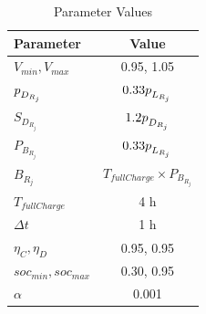 \documentclass[../../outputs/main.tex]{subfiles}
\begin{document}
\def\ds{\rule{0pt}{1.5ex}} %

\begin{table}[h!]
    \centering
    \caption{Parameter Values}
    \begin{tabular}{|l|c|}
    \hline
    \textbf{Parameter} & \textbf{Value} \\ \hline
    $V_{min}, V_{max}$ & 0.95, 1.05 \\ \hline
    $p_{\ds D_{R_j}}$ & $0.33 p_{\ds L_{R_j}}$ \\ \hline
    $S_{D_{R_j}}$ & $1.2 p_{\ds D_{R_j}}$ \\ \hline
    $P_{B_{R_j}}$ & $0.33 p_{\ds L_{R_j}}$ \\ \hline
    $B_{R_j}$ & $T_{fullCharge} \times P_{B_{R_j}}$ \\ \hline
    $T_{fullCharge}$ & 4 h \\ \hline
    $\Delta t$ & 1 h \\ \hline
    $\eta_C, \eta_D$ & 0.95, 0.95 \\ \hline
    $soc_{min}, soc_{max}$ & 0.30, 0.95 \\ \hline
    $\alpha$ & 0.001 \\ \hline
    \end{tabular}
    \label{table:parameter-values}
\end{table}
\end{document}
